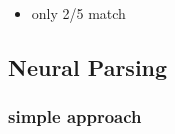 \documentclass[11pt]{article}
\begin{document}
\begin{minipage}[l]{.5\linewidth}
    \begin{figure}[H]
        \centering
    \end{figure}    
\end{minipage}\hfill
\begin{minipage}[r]{.48\linewidth}
    \begin{itemize}
        \item only 2/5 match
    \end{itemize}
\end{minipage}

\subsection{Neural Parsing}

\subsubsection{simple approach}
\end{document}

